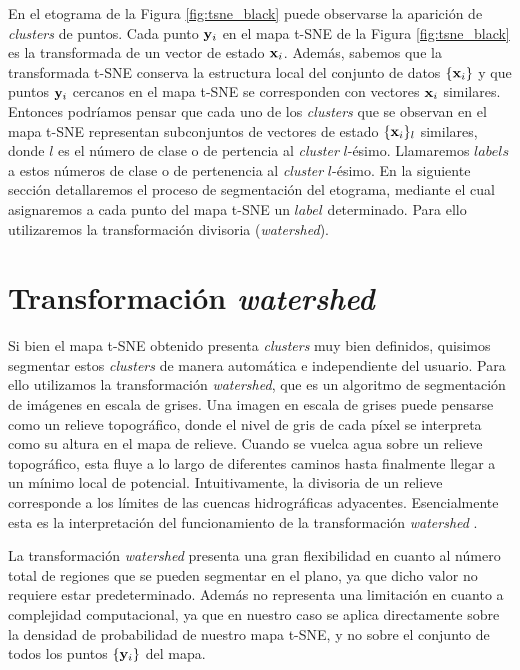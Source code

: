 En el etograma de la Figura \ref{fig:tsne_black} puede observarse la aparición de \textit{clusters} de puntos. Cada punto $\vb{y}_i$ en el mapa t-SNE de la Figura \ref{fig:tsne_black} es la transformada de un vector de estado $\vb{x}_i$. Además, sabemos que la transformada t-SNE conserva la estructura local del conjunto de datos $\{\vb{x}_i\}$ y que puntos $\vb{y}_i$ cercanos en el mapa t-SNE se corresponden con vectores $\vb{x}_i$ similares. Entonces podríamos pensar que cada uno de los \textit{clusters} que se observan en el mapa t-SNE representan subconjuntos de vectores de estado $\{\vb{x}_i\}_l$ similares, donde $l$ es el número de clase o de pertencia al \textit{cluster} $l$-ésimo. Llamaremos $labels$ a estos números de clase o de pertenencia al \textit{cluster} $l$-ésimo. En la siguiente sección detallaremos el proceso de segmentación del etograma, mediante el cual asignaremos a cada punto del mapa t-SNE un $label$ determinado. Para ello utilizaremos la transformación divisoria (\textit{watershed}).

\section{Transformación \textit{watershed}}\label{sec:watershed}

Si bien el mapa t-SNE obtenido presenta \textit{clusters} muy bien definidos, quisimos segmentar estos \textit{clusters} de manera automática e independiente del usuario. Para ello utilizamos la transformación \textit{watershed}, que es un algoritmo de segmentación de imágenes en escala de grises. Una imagen en escala de grises puede pensarse como un relieve topográfico, donde el nivel de gris de cada píxel se interpreta como su altura en el mapa de relieve. Cuando se vuelca agua sobre un relieve topográfico, esta fluye a lo largo de diferentes caminos hasta finalmente llegar a un mínimo local de potencial. Intuitivamente, la divisoria de un relieve corresponde a los límites de las cuencas hidrográficas adyacentes. Esencialmente esta es la interpretación del funcionamiento de la transformación \textit{watershed} \cite{meyer_topographic, meyer_beucher_morphological}.

La transformación \textit{watershed} presenta una gran flexibilidad en cuanto al número total de regiones que se pueden segmentar en el plano, ya que dicho valor no requiere estar predeterminado. Además no representa una limitación en cuanto a complejidad computacional, ya que en nuestro caso se aplica directamente sobre la densidad de probabilidad de nuestro mapa t-SNE, y no sobre el conjunto de todos los puntos $\{\vb{y}_i\}$ del mapa.

